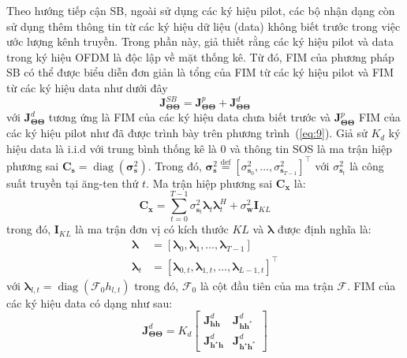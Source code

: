 Theo hướng tiếp cận SB, ngoài sử dụng các ký hiệu pilot, các bộ nhận dạng còn sử dụng thêm thông tin từ các ký hiệu dữ liệu (data) không biết trước trong việc ước lượng kênh truyền. Trong phần này, giả thiết rằng các ký hiệu pilot và data trong ký hiệu OFDM là độc lập về mặt thống kê. Từ đó, FIM của phương pháp SB có thể được biểu diễn đơn giản là tổng của FIM từ các ký hiệu pilot và FIM từ các ký hiệu data như dưới đây
\begin{equation}
    \label{eq:17}
    \mathbf{J}_{\boldsymbol{\Theta} \boldsymbol{\Theta}}^{SB}= \mathbf{J}_{\boldsymbol{\Theta} \boldsymbol{\Theta}}^{p} + \mathbf{J}_{\boldsymbol{\Theta} \boldsymbol{\Theta}}^{d}
\end{equation}
với $\mathbf{J}_{\boldsymbol{\Theta} \boldsymbol{\Theta}}^{d}$ tương ứng là FIM của các ký hiệu data chưa biết trước và $\mathbf{J}_{\boldsymbol{\Theta} \boldsymbol{\Theta}}^{p}$ FIM của các ký hiệu pilot như đã được trình bày trên phương trình~(\ref{eq:9}). Giả sử $K_d$ ký hiệu data là i.i.d với trung bình thống kê là $0$ và thông tin SOS là ma trận hiệp phương sai $\mathbf{C}_{\mathbf{s}}=\operatorname{diag}\left(\boldsymbol{\sigma}^2_{\mathbf{s}}\right)$. Trong đó, $\boldsymbol{\sigma}_{\mathbf{s}}^{2} \stackrel{\operatorname{def}}{=}\left[\sigma_{\mathbf{s}_{0}}^{2}, \ldots, \sigma_{\mathbf{s}_{T-1}}^{2}\right]^\top$ với $\sigma^2_{\mathbf{s}_t}$ là công suất truyền tại ăng-ten thứ $t$. Ma trận hiệp phương sai $\mathbf{C}_{\mathbf{x}}$ là:
\begin{equation}
    \mathbf{C}_{\mathbf{x}}=\sum_{t=0}^{T-1} \sigma_{\mathbf{s}_{t}}^{2} \boldsymbol{\lambda}_{t} \boldsymbol{\lambda}_{t}^{H}+\sigma_{\mathbf{w}}^{2} \mathbf{I}_{K L}
\end{equation}
trong đó, $\mathbf{I}_{KL}$ là ma trận đơn vị có kích thước $K L$ và $\boldsymbol{\lambda}$ được định nghĩa là:
\begin{equation}
    \begin{aligned}
        \boldsymbol{\lambda} &=\left[\boldsymbol{\lambda}_{0}, \boldsymbol{\lambda}_{1}, \ldots, \boldsymbol{\lambda}_{T-1}\right] \\ 
        \boldsymbol{\lambda}_{t}&=\left[\boldsymbol{\lambda}_{0, t}, \boldsymbol{\lambda}_{1, t}, \ldots, \boldsymbol{\lambda}_{L-1, t}\right]^{\top}
    \end{aligned}
\end{equation}
với $\boldsymbol{\lambda}_{l, t}=\operatorname{diag}\left(\mathcal{F}_0 h_{l, t}\right)$ trong đó, $\mathcal{F}_0$ là cột đầu tiên của ma trận $\mathcal{F}$. FIM của các ký hiệu data có dạng như sau:
\begin{equation}
    \mathbf{J}_{\boldsymbol{\Theta} \boldsymbol{\Theta}}^{d}=K_{d}\left[\begin{array}{cc}
    \mathbf{J}_{\mathbf{h} \mathbf{h}}^{d} & \mathbf{J}_{\mathbf{h} \mathbf{h}^{*}}^{d} \\
    \mathbf{J}_{\mathbf{h}^{\star} \mathbf{h}}^{d} & \mathbf{J}_{\mathbf{h}^{\star} \mathbf{h}^{*}}^{d}
    \end{array}\right]
\end{equation}

